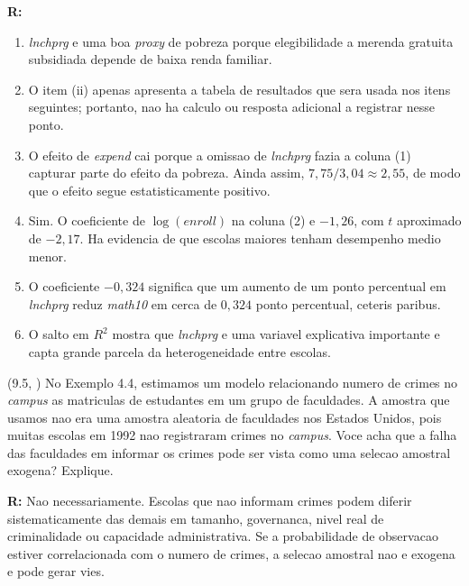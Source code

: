 \documentclass[12pt,letterpaper, onecolumn]{exam}
\renewenvironment{solution}
{\par\noindent\textbf{R:}\enspace\color{blue}}
{\par\color{black}}
\begin{document}
\begin{questions}
\begin{solution}
\begin{enumerate}[label=(\roman*)]
    \item \textit{lnchprg} e uma boa \textit{proxy} de pobreza porque elegibilidade a merenda gratuita subsidiada depende de baixa renda familiar.
    \item O item (ii) apenas apresenta a tabela de resultados que sera usada nos itens seguintes; portanto, nao ha calculo ou resposta adicional a registrar nesse ponto.
    \item O efeito de \textit{expend} cai porque a omissao de \textit{lnchprg} fazia a coluna (1) capturar parte do efeito da pobreza. Ainda assim, \(7,75/3,04\approx 2,55\), de modo que o efeito segue estatisticamente positivo.
    \item Sim. O coeficiente de \(\log(enroll)\) na coluna (2) e \(-1,26\), com \(t\) aproximado de \(-2,17\). Ha evidencia de que escolas maiores tenham desempenho medio menor.
    \item O coeficiente \(-0,324\) significa que um aumento de um ponto percentual em \textit{lnchprg} reduz \textit{math10} em cerca de \(0,324\) ponto percentual, ceteris paribus.
    \item O salto em \(R^2\) mostra que \textit{lnchprg} e uma variavel explicativa importante e capta grande parcela da heterogeneidade entre escolas.
\end{enumerate}
\end{solution}

\vspace{0.7cm}

\question (9.5, \citep{wooldridge2016}) No Exemplo 4.4, estimamos um modelo relacionando numero de crimes no \textit{campus} as matriculas de estudantes em um grupo de faculdades. A amostra que usamos nao era uma amostra aleatoria de faculdades nos Estados Unidos, pois muitas escolas em 1992 nao registraram crimes no \textit{campus}. Voce acha que a falha das faculdades em informar os crimes pode ser vista como uma selecao amostral exogena? Explique.

\begin{solution}
Nao necessariamente. Escolas que nao informam crimes podem diferir sistematicamente das demais em tamanho, governanca, nivel real de criminalidade ou capacidade administrativa. Se a probabilidade de observacao estiver correlacionada com o numero de crimes, a selecao amostral nao e exogena e pode gerar vies.
\end{solution}


\end{questions}
\end{document}
